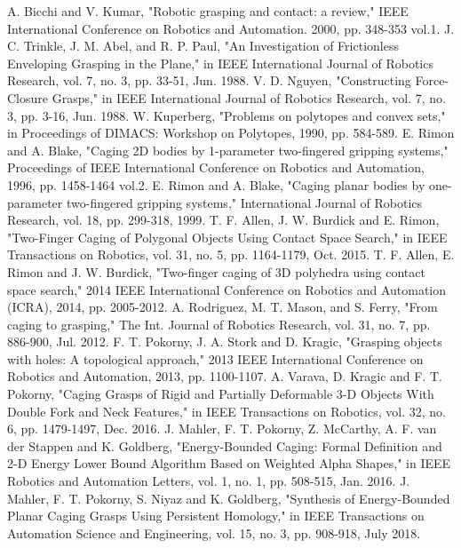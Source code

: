 \documentclass[conference]{IEEEtran}
\begin{document}
\balance
\begin{thebibliography}{00}
	 A. Bicchi and V. Kumar, "Robotic grasping and contact: a review," IEEE International Conference on Robotics and Automation. 2000, pp. 348-353 vol.1.
	 J. C. Trinkle, J. M. Abel, and R. P. Paul, "An Investigation of Frictionless Enveloping Grasping in the Plane," in IEEE International Journal of Robotics Research, vol. 7, no. 3, pp. 33-51, Jun. 1988.
	 V. D. Nguyen, "Constructing Force-Closure Grasps," in IEEE International Journal of Robotics Research, vol. 7, no. 3, pp. 3-16, Jun. 1988.
	 W. Kuperberg, "Problems on polytopes and convex sets," in Proceedings of DIMACS: Workshop on Polytopes, 1990, pp. 584-589.
	 E. Rimon and A. Blake, "Caging 2D bodies by 1-parameter two-fingered gripping systems," Proceedings of IEEE International Conference on Robotics and Automation, 1996, pp. 1458-1464 vol.2.
	 E. Rimon and A. Blake, "Caging planar bodies by one-parameter two-fingered gripping systems," International Journal of Robotics Research, vol. 18, pp. 299-318, 1999.
	 T. F. Allen, J. W. Burdick and E. Rimon, "Two-Finger Caging of Polygonal Objects Using Contact Space Search," in IEEE Transactions on Robotics, vol. 31, no. 5, pp. 1164-1179, Oct. 2015.
	 T. F. Allen, E. Rimon and J. W. Burdick, "Two-finger caging of 3D polyhedra using contact space search," 2014 IEEE International Conference on Robotics and Automation (ICRA), 2014, pp. 2005-2012.
	 A. Rodriguez, M. T. Mason, and S. Ferry, "From caging to grasping," The Int. Journal of Robotics Research, vol. 31, no. 7, pp. 886-900, Jul. 2012.
	 F. T. Pokorny, J. A. Stork and D. Kragic, "Grasping objects with holes: A topological approach," 2013 IEEE International Conference on Robotics and Automation, 2013, pp. 1100-1107.
	 A. Varava, D. Kragic and F. T. Pokorny, "Caging Grasps of Rigid and Partially Deformable 3-D Objects With Double Fork and Neck Features," in IEEE Transactions on Robotics, vol. 32, no. 6, pp. 1479-1497, Dec. 2016.
	 J. Mahler, F. T. Pokorny, Z. McCarthy, A. F. van der Stappen and K. Goldberg, "Energy-Bounded Caging: Formal Definition and 2-D Energy Lower Bound Algorithm Based on Weighted Alpha Shapes," in IEEE Robotics and Automation Letters, vol. 1, no. 1, pp. 508-515, Jan. 2016.
	 J. Mahler, F. T. Pokorny, S. Niyaz and K. Goldberg, "Synthesis of Energy-Bounded Planar Caging Grasps Using Persistent Homology," in IEEE Transactions on Automation Science and Engineering, vol. 15, no. 3, pp. 908-918, July 2018.

\end{thebibliography}
\end{document}
